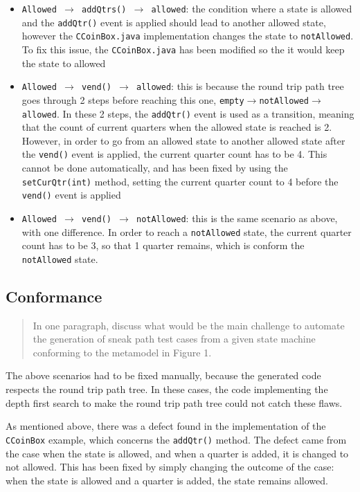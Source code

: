 \documentclass[ieee]{submit}
\begin{document}
\begin{itemize}
\item {\tt Allowed $\rightarrow$ addQtrs() $\rightarrow$ allowed}: the condition where a state is allowed and the {\tt addQtr()} event is applied should lead to another allowed state, however the {\tt CCoinBox.java} implementation changes the state to {\tt notAllowed}. To fix this issue, the {\tt CCoinBox.java} has been modified so the it would keep the state to allowed
\item {\tt Allowed $\rightarrow$ vend() $\rightarrow$ allowed}: this is because the round trip path tree goes through 2 steps before reaching this one, {\tt empty$\rightarrow$notAllowed$\rightarrow$allowed}. In these 2 steps, the {\tt addQtr()} event is used as a transition, meaning that the count of current quarters when the allowed state is reached is 2. However, in order to go from an allowed state to another allowed state after the {\tt vend()} event is applied, the current quarter count has to be 4. This cannot be done automatically, and has been fixed by using the {\tt setCurQtr(int)} method, setting the current quarter count to 4 before the {\tt vend()} event is applied
\item {\tt Allowed $\rightarrow$ vend() $\rightarrow$ notAllowed}: this is the same scenario as above, with one difference. In order to reach a {\tt notAllowed} state, the current quarter count has to be 3, so that 1 quarter remains, which is conform the {\tt notAllowed} state.
\end{itemize}


\subsection{Conformance}

\begin{quote}
In one paragraph, discuss what would be the main challenge to automate the generation of sneak path test cases from a given state machine conforming to the metamodel in Figure 1.
\end{quote}

The above scenarios had to be fixed manually, because the generated code respects the round trip path tree. In these cases, the code implementing the depth first search to make the round trip path tree could not catch these flaws. 

	As mentioned above, there was a defect found in the implementation of the {\tt CCoinBox} example, which concerns the {\tt addQtr()} method. The defect came from the case when the state is allowed, and when a quarter is added, it is changed to not allowed. This has been fixed by simply changing the outcome of the case: when the state is allowed and a quarter is added, the state remains allowed.

\received{\thedate}{\thedate}{\thedate}
\end{document}
